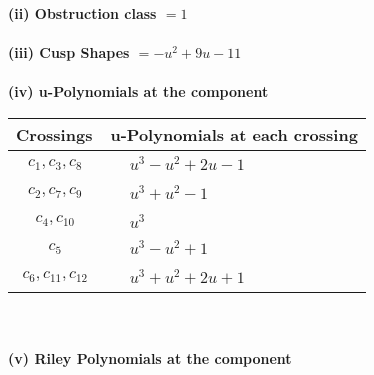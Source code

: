 \documentclass[1p]{elsarticle_modified}
\theoremstyle{definition}
\begin{document}
\flushleft \textbf{(ii) Obstruction class $= 1$}\\~\\
\flushleft \textbf{(iii) Cusp Shapes $= - u^2+9 u-11$}\\~\\
\newpage\renewcommand{\arraystretch}{1}
\flushleft \textbf{(iv) u-Polynomials at the component}\newline \\
\begin{tabular}{m{50pt}|m{274pt}}
Crossings & \hspace{64pt}u-Polynomials at each crossing \\
\hline $$\begin{aligned}c_{1},c_{3},c_{8}\end{aligned}$$&$\begin{aligned}
&u^3- u^2+2 u-1
\end{aligned}$\\
\hline $$\begin{aligned}c_{2},c_{7},c_{9}\end{aligned}$$&$\begin{aligned}
&u^3+u^2-1
\end{aligned}$\\
\hline $$\begin{aligned}c_{4},c_{10}\end{aligned}$$&$\begin{aligned}
&u^3
\end{aligned}$\\
\hline $$\begin{aligned}c_{5}\end{aligned}$$&$\begin{aligned}
&u^3- u^2+1
\end{aligned}$\\
\hline $$\begin{aligned}c_{6},c_{11},c_{12}\end{aligned}$$&$\begin{aligned}
&u^3+u^2+2 u+1
\end{aligned}$\\
\hline
\end{tabular}\\~\\
\newpage\renewcommand{\arraystretch}{1}
\flushleft \textbf{(v) Riley Polynomials at the component}\newline \\
\end{document}
